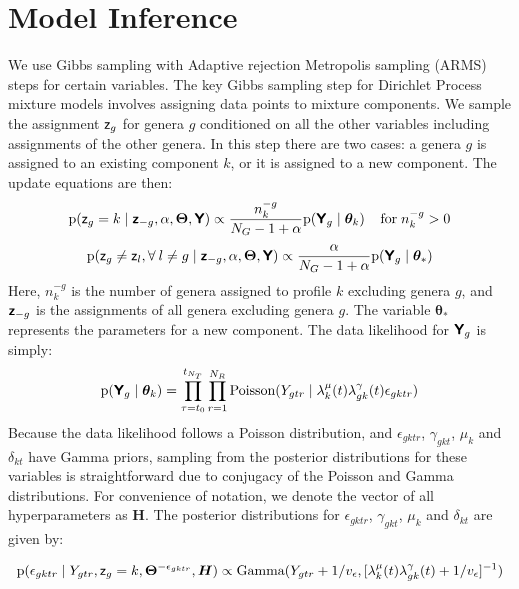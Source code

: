\section{Model Inference} \label{sec:Model Inference}
We use Gibbs sampling with Adaptive rejection Metropolis sampling (ARMS) steps for certain variables.  The key Gibbs sampling step for Dirichlet Process mixture models involves assigning data points to mixture components.  We sample the assignment $\mbox{\textsf{z}}_{g}$ for genera $g$ conditioned on all the other variables including assignments of the other genera.  In this step there are two cases: a genera $g$ is assigned to an existing component $k$, or it is assigned to a new component.  The update equations are then:
\begin{equation} \label{eqn:assign existing}
\textrm{p}(\mbox{\textsf{z}}_g = k \; | \; \mbox{\textsf{\textbf{z}}}_{-g},\alpha,\bm{\Theta},
\mbox{\textsf{\textbf{Y}}}) \propto \frac{n_{k}^{-g}}{N_G-1+\alpha}
\textrm{p}(\mbox{\textsf{\textbf{Y}}}_g \; | \; \bm{\theta}_{k}) \; \; \; \; \textrm{for} \;
n_{k}^{-g} > 0
\end{equation}
\begin{equation}
\label{eqn:assign new} \textrm{p}(\mbox{\textsf{z}}_g \neq \mbox{\textsf{z}}_l,
\forall \: l \neq g \; | \; \mbox{\textsf{\textbf{z}}}_{-g},\alpha,\bm{\Theta}, \mbox{\textsf{\textbf{Y}}})
\propto \frac{\alpha}{N_{G}-1+\alpha} \textrm{p}(\mbox{\textsf{\textbf{Y}}}_g \; | \; \bm{\theta}_{*})
\end{equation}
Here, $n_{k}^{-g}$ is the number of genera assigned to profile $k$ excluding genera $g$, and $\mbox{\textsf{\textbf{z}}}_{-g}$ is the assignments of all genera excluding genera $g$.  The variable $\bm{\theta}_{*}$ represents the parameters for a new component.  The data likelihood for $\mbox{\textsf{\textbf{Y}}}_g$ is simply:
\[
\textrm{p}(\mbox{\textsf{\textbf{Y}}}_g \; | \; \bm{\theta}_{k}) = \prod_{\tau=t_0}^{t_{N_T}} \prod_{r=1}^{N_R} \textrm{Poisson}(Y_{gtr} \; | \; \lambda^{\mu}_{k}(t) \lambda^{\gamma}_{gk}(t) \epsilon_{gktr})
\]
Because the data likelihood follows a Poisson distribution, and $\epsilon_{gktr}$, $\gamma_{gkt}$, $\mu_{k}$ and $\delta_{kt}$ have Gamma priors, sampling from the posterior distributions for these variables is straightforward due to conjugacy of the Poisson and Gamma distributions.  For convenience of notation, we denote the vector of all hyperparameters as $\bm{H}$.  The posterior distributions for $\epsilon_{gktr}$, $\gamma_{gkt}$, $\mu_{k}$ and $\delta_{kt}$ are given by:

\begin{equation}
\textrm{p}(\epsilon_{gktr} \; | \; Y_{gtr},\mbox{\textsf{z}}_g = k,\bm{\Theta}^{-\epsilon_{gktr}},\bm{H}) \propto \textrm{Gamma}(Y_{gtr} + 1/v_{\epsilon},[\lambda^{\mu}_{k}(t) \lambda^{\gamma}_{gk}(t) + 1/v_{\epsilon}]^{-1})
\end{equation}

